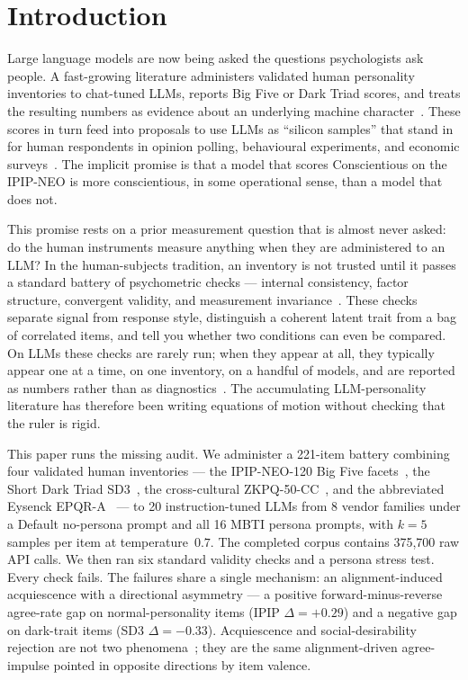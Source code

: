 \documentclass[11pt]{article}
\begin{document}
\section{Introduction}
\label{sec:intro}

Large language models are now being asked the questions psychologists ask people. A fast-growing literature administers validated human personality inventories to chat-tuned LLMs, reports Big Five or Dark Triad scores, and treats the resulting numbers as evidence about an underlying machine character~\citep{miotto2023gpt3,serapio2025psychometric,jiang2023personallm,huang2023psychobench,bodroza2024personality}. These scores in turn feed into proposals to use LLMs as ``silicon samples'' that stand in for human respondents in opinion polling, behavioural experiments, and economic surveys~\citep{argyle2023one,horton2023homo,aher2023using,park2023generative}. The implicit promise is that a model that scores Conscientious on the IPIP-NEO is more conscientious, in some operational sense, than a model that does not.

This promise rests on a prior measurement question that is almost never asked: do the human instruments measure anything when they are administered to an LLM? In the human-subjects tradition, an inventory is not trusted until it passes a standard battery of psychometric checks --- internal consistency, factor structure, convergent validity, and measurement invariance~\citep{cronbach1951coefficient,kaiser1960application,vandenberg2000review}. These checks separate signal from response style, distinguish a coherent latent trait from a bag of correlated items, and tell you whether two conditions can even be compared. On LLMs these checks are rarely run; when they appear at all, they typically appear one at a time, on one inventory, on a handful of models, and are reported as numbers rather than as diagnostics~\citep{suhr2025challenging,pelet2025persistent,schaekermann2024personality}. The accumulating LLM-personality literature has therefore been writing equations of motion without checking that the ruler is rigid.

This paper runs the missing audit. We administer a 221-item battery combining four validated human inventories --- the IPIP-NEO-120 Big Five facets~\citep{johnson2014measuring}, the Short Dark Triad SD3~\citep{jones2014introducing}, the cross-cultural ZKPQ-50-CC~\citep{aluja2006cross}, and the abbreviated Eysenck EPQR-A~\citep{francis1992development} --- to 20 instruction-tuned LLMs from 8 vendor families under a Default no-persona prompt and all 16 MBTI persona prompts, with $k=5$ samples per item at temperature~$0.7$. The completed corpus contains 375{,}700 raw API calls. We then ran six standard validity checks and a persona stress test. Every check fails. The failures share a single mechanism: an alignment-induced acquiescence with a directional asymmetry --- a positive forward-minus-reverse agree-rate gap on normal-personality items (IPIP $\Delta=+0.29$) and a negative gap on dark-trait items (SD3 $\Delta=-0.33$). Acquiescence and social-desirability rejection are not two phenomena~\citep{couch1960yeasayers,crowne1960social,paulhus1991response,billiet2000modeling}; they are the same alignment-driven agree-impulse pointed in opposite directions by item valence.
\end{document}
